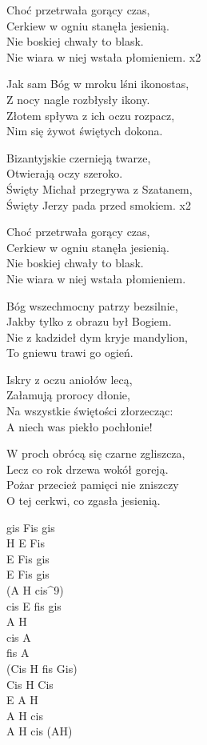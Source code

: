 \begin{text}
    Choć przetrwała gorący czas,\\
    Cerkiew w ogniu stanęła jesienią.\\
    Nie boskiej chwały to blask.\\
    Nie wiara w niej wstała płomieniem. x2

    Jak sam Bóg w mroku lśni ikonostas,\\
    Z nocy nagle rozbłysły ikony.\\
    Złotem spływa z ich oczu rozpacz,\\
    Nim się żywot świętych dokona.

    Bizantyjskie czernieją twarze,\\
    Otwierają oczy szeroko.\\
    \vin Święty Michał przegrywa z Szatanem,\\
    \vin Święty Jerzy pada przed smokiem. x2

    \vin Choć przetrwała gorący czas,\\
    \vin Cerkiew w ogniu stanęła jesienią.\\
    \vin  Nie boskiej chwały to blask.\\
    \vin Nie wiara w niej wstała płomieniem.

    Bóg wszechmocny patrzy bezsilnie,\\
    Jakby tylko z obrazu był Bogiem.\\
    Nie z kadzideł dym kryje mandylion,\\
    To gniewu trawi go ogień.

    Iskry z oczu aniołów lecą,\\
    Załamują prorocy dłonie,\\
    Na wszystkie świętości złorzecząc:\\
    A niech was piekło pochłonie!

    W proch obrócą się czarne zgliszcza,\\
    Lecz co rok drzewa wokół goreją.\\
    Pożar przecież pamięci nie zniszczy\\
    O tej cerkwi, co zgasła jesienią.
\end{text}
\begin{chord}
    gis Fis gis\\
    H E Fis\\
    E Fis gis\\
    E Fis gis\\
    (A H cis^9)\\
    cis E fis gis\\
    A H\\
    cis A\\
    fis A\\
    (Cis H fis Gis)\\
    Cis H Cis\\
    E A H\\
    A H cis\\
    A H cis (AH)
\end{chord}